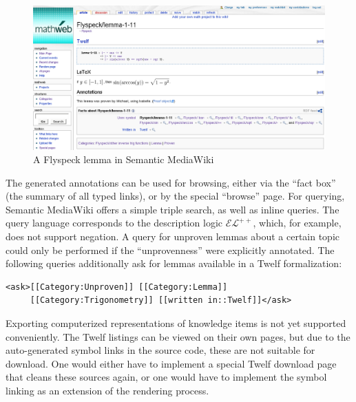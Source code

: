 \begin{figure}
  \centering
  \includegraphics[width=\textwidth]{images/smw-lemma}
  \caption[A Flyspeck lemma in Semantic MediaWiki]{A Flyspeck lemma in Semantic
    MediaWiki\protect\footnotemark}
  \label{fig:smw-lemma}
\end{figure}
\addtocounter{footnote}{-1}

The generated annotations can be used for browsing, either via the
``fact box'' (the summary of all typed links), or by the special ``browse''
page.  For querying, Semantic MediaWiki offers a simple triple search, as well
as inline queries.  The query language corresponds to the description logic
$\mathcal{EL}^{++}$\cite{KrSchVr:semwiki-reasoning07}, which, for example, does
not support negation.  A query for unproven lemmas about a certain topic could
only be performed if the ``unprovenness'' were explicitly annotated.  The
following queries additionally ask for lemmas available in a Twelf formalization:

\begin{lstlisting}
<ask>[[Category:Unproven]] [[Category:Lemma]]
     [[Category:Trigonometry]] [[written in::Twelf]]</ask>
\end{lstlisting}

Exporting computerized representations of knowledge items is not yet supported
conveniently.  The Twelf listings can be viewed on their own pages, but due to
the auto-generated symbol links in the source code, these are not suitable for
download.  One would either have to implement a special Twelf download page that
cleans these sources again, or one would have to implement the symbol linking as
an extension of the rendering process.

